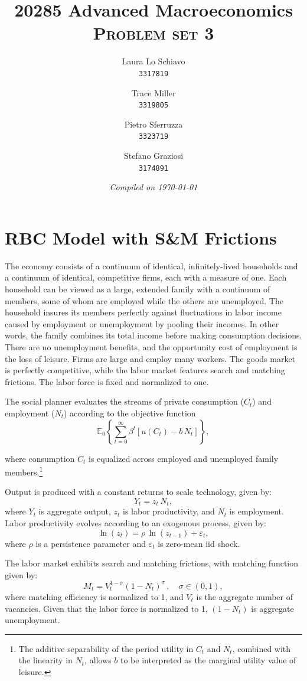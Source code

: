 \documentclass[dvipsnames,11pt]{article}
\title{20285 Advanced Macroeconomics \\[0.5cm] \Huge \textsc{Problem set 3}}
\author{
        Laura Lo Schiavo \\
        \texttt{3317819}
        \and 
        Trace Miller \\
        \texttt{3319805}
        \and 
        Pietro Sferruzza \\
        \texttt{3323719}
        \and
        Stefano Graziosi\\
        \texttt{3174891}
        }
\date{\emph{Compiled on \today}}
\begin{document}
\maketitle

\tableofcontents

\section{RBC Model with S\&M Frictions}

    The economy consists of a continuum of identical, infinitely-lived households and a continuum of identical, competitive firms, each with a measure of one. Each household can be viewed as a large, extended family with a continuum of members, some of whom are employed while the others are unemployed. The household insures its members perfectly against fluctuations in labor income caused by employment or unemployment by pooling their incomes. In other words, the family combines its total income before making consumption decisions. There are no unemployment benefits, and the opportunity cost of employment is the loss of leisure. Firms are large and employ many workers. The goods market is perfectly competitive, while the labor market features search and matching frictions. The labor force is fixed and normalized to one.

    The social planner evaluates the streams of private consumption ($C_t$) and
    employment ($N_t$) according to the objective function
    \begin{equation}\label{eq:objective}
        \mathbb{E}_0\left\{\sum_{t=0}^\infty \beta^t \left[u(C_t) - b\,N_t \right]\right\},
    \end{equation}

    where consumption $C_t$ is equalized across employed and unemployed family members.\footnote{The additive separability of the period utility in $C_t$ and $N_t$, combined with the linearity in $N_t$, allows $b$ to be interpreted as the marginal utility value of leisure.}

    Output is produced with a constant returns to scale technology, given by:
    \[
    Y_t = z_t\,N_t,
    \]
    where $Y_t$ is aggregate output, $z_t$ is labor productivity, and $N_t$ is employment. Labor productivity evolves according to an exogenous process, given by:
    \[
    \ln(z_t) = \rho\,\ln(z_{t-1}) + \varepsilon_t,
    \]
    where $\rho$ is a persistence parameter and $\varepsilon_t$ is zero-mean iid shock.

    The labor market exhibits search and matching frictions, with matching function given by:
    \begin{equation}\label{eq:matching}
        M_t = V_t^{1-\sigma}(1-N_t)^\sigma\,,\quad \sigma\in (0,1),
    \end{equation}
    where matching efficiency is normalized to 1, and $V_t$ is the aggregate number of vacancies. Given that the labor force is normalized to 1, $(1-N_t)$ is aggregate unemployment.
    
\end{document}
